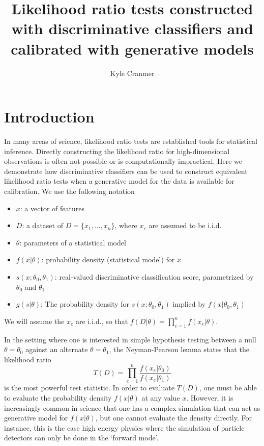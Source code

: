 \documentclass[11pt, oneside]{article}   	%
\title{Likelihood ratio tests constructed with discriminative classifiers and calibrated with generative models}
\author{Kyle Cranmer}
\begin{document}
\maketitle

\section{Introduction}


In many areas of science, likelihood ratio tests  are established tools for statistical inference. 
Directly constructing the likelihood ratio for high-dimensional observations 
is often not possible or is computationally impractical. Here we demonstrate how 
discriminative classifiers can be used to construct equivalent likelihood ratio tests when 
a generative model for the data is available for calibration.  We use the following notation

\begin{itemize}
 \item $x$: a vector of features
 \item $D$: a dataset of $D=\{x_1, \dots, x_n\}$, where $x_e$ are assumed to be i.i.d.
 \item $\theta$: parameters of a statistical model
\item $f(x| \theta)$:  probability density  (statistical model) for $x$ 
\item $s(x;\theta_0, \theta_1)$: real-valued discriminative classification score, parametrized by $\theta_0$ and $\theta_1$
\item $g( s | \theta )$: The probability density  for $s(x; \theta_0, \theta_1)$ implied by $f(x|\theta_0, \theta_1)$ \end{itemize}
We will assume the $x_e$ are i.i.d., so that $f(D|\theta) = \prod_{e=1}^n f(x_e | \theta)$.

In the setting where one is interested in simple hypothesis testing between a null $\theta=\theta_0$ against an alternate $\theta=\theta_1$, the Neyman-Pearson lemma states that the likelihood ratio 
\begin{equation}
T(D) = \prod_{e=1}^n \frac{ f(x_e|\theta_0)}{ f(x_e|\theta_1)}
\end{equation}
is the most powerful test statistic. In order to evaluate $T(D)$, one must be able to evaluate the probability density 
$f(x| \theta)$ at any value $x$. However, it is increasingly common in science that one has a complex simulation that 
can act as generative model  for $f(x|\theta)$, but one cannot evaluate the density directly. For instance, this is the case 
high energy physics where the simulation of particle detectors can only be done in the `forward mode'. 
\end{document}
